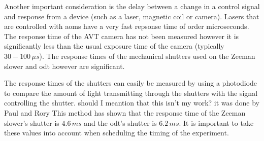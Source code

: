 Another important consideration is the delay between a change in a control signal and response from a device (such as a laser, magnetic coil or camera). Lasers that are controlled with \glspl{aom} have a very fast repsonse time of order microseconds. The response time of the AVT camera has not been measured however it is significantly less than the usual exposure time of the camera (typically $30-100\,\unit{\mu s}$). The response times of the mechanical shutters used on the Zeeman slower and \gls{odt} however are significant.

The response times of the shutters can easily be measured by using a photodiode to compare the amount of light transmitting through the shutters with the signal controlling the shutter. {\color{red} should I meantion that this isn't my work? it was done by Paul and Rory} This method has shown that the response time of the Zeeman slower's shutter is $4.6\,\unit{ms}$ and the \gls{odt}'s shutter is $6.2\,\unit{ms}$. It is important to take these values into account when scheduling the timing of the experiment.
